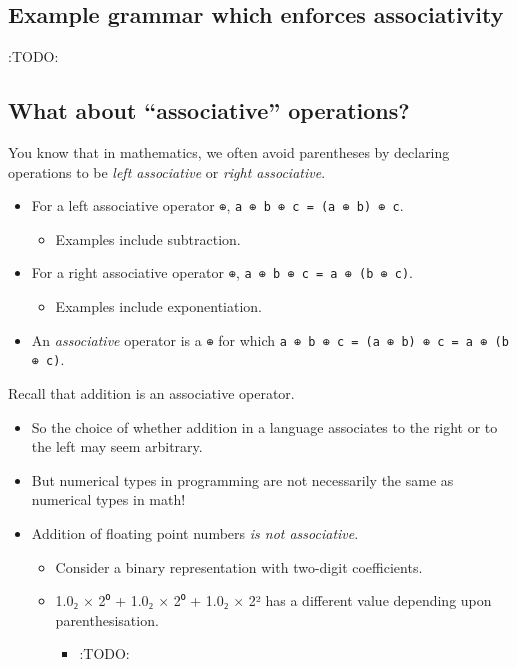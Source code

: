 \documentclass[11pt]{article}
\theoremstyle{definition}
\begin{document}
\subsection{Example grammar which enforces associativity}
\label{sec:org84f2198}
:TODO:

\subsection{What about “associative” operations?}
\label{sec:org2a5a8df}
You know that in mathematics,
we often avoid parentheses by declaring operations
to be \emph{left associative} or \emph{right associative}.
\begin{itemize}
\item For a left associative operator \texttt{⊕},
\texttt{a ⊕ b ⊕ c = (a ⊕ b) ⊕ c}.
\begin{itemize}
\item Examples include subtraction.
\end{itemize}
\item For a right associative operator \texttt{⊕},
\texttt{a ⊕ b ⊕ c = a ⊕ (b ⊕ c)}.
\begin{itemize}
\item Examples include exponentiation.
\end{itemize}
\item An \emph{associative} operator is a \texttt{⊕} for which
\texttt{a ⊕ b ⊕ c = (a ⊕ b) ⊕ c = a ⊕ (b ⊕ c)}.
\end{itemize}

Recall that addition is an associative operator.
\begin{itemize}
\item So the choice of whether addition in a language associates to
the right or to the left may seem arbitrary.
\item But numerical types in programming are not necessarily
the same as numerical types in math!
\item Addition of floating point numbers \emph{is not associative}.
\begin{itemize}
\item Consider a binary representation with two-digit coefficients.
\item 1.0₂ × 2⁰ + 1.0₂ × 2⁰ + 1.0₂ × 2² has a different value depending
upon parenthesisation.
\begin{itemize}
\item :TODO:
\end{itemize}
\end{itemize}
\end{itemize}
\end{document}
